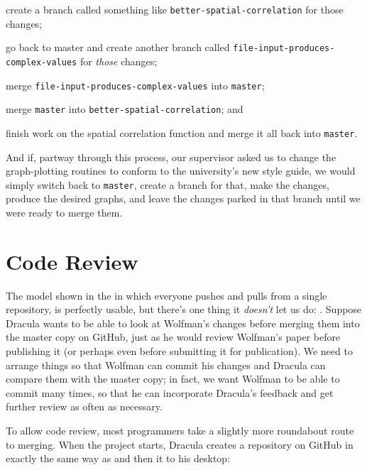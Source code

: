 \begin{swcenumerate}
\item
  create a branch called something like
  \texttt{better-spatial-correlation} for those changes;
\item
  go back to master and create another branch called
  \texttt{file-input-produces-complex-values} for \emph{those} changes;
\item
  merge \texttt{file-input-produces-complex-values} into
  \texttt{master};
\item
  merge \texttt{master} into \texttt{better-spatial-correlation}; and
\item
  finish work on the spatial correlation function and merge it all back
  into \texttt{master}.
\end{swcenumerate}

And if, partway through this process, our supervisor asked us to change
the graph-plotting routines to conform to the university's new style
guide, we would simply switch back to \texttt{master}, create a branch
for that, make the changes, produce the desired graphs, and leave the
changes parked in that branch until we were ready to merge them.

\section{Code Review}

The model shown in the  in
which everyone pushes and pulls from a single repository, is perfectly
usable, but there's one thing it \emph{doesn't} let us do:
. Suppose Dracula wants to be able
to look at Wolfman's changes before merging them into the master copy on
GitHub, just as he would review Wolfman's paper before publishing it (or
perhaps even before submitting it for publication). We need to arrange
things so that Wolfman can commit his changes and Dracula can compare
them with the master copy; in fact, we want Wolfman to be able to commit
many times, so that he can incorporate Dracula's feedback and get
further review as often as necessary.

To allow code review, most programmers take a slightly more roundabout
route to merging. When the project starts, Dracula creates a repository
on GitHub in exactly the same way as  and then
 it to his desktop:



